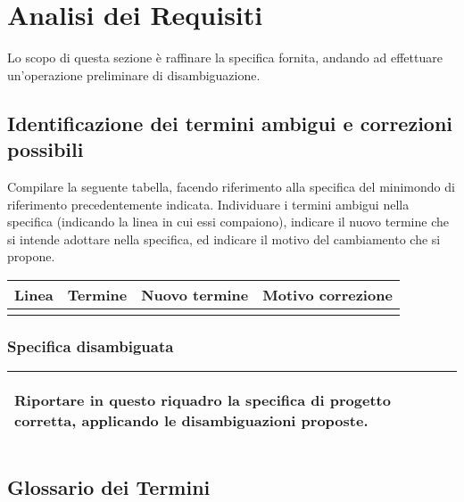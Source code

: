 \section{Analisi dei Requisiti}

\begin{templateblock}
    Lo scopo di questa sezione è raffinare la specifica fornita, andando ad
    effettuare un’operazione preliminare di disambiguazione.
\end{templateblock}

\subsection*{Identificazione dei termini ambigui e correzioni possibili}

\begin{templateblock}
    Compilare la seguente tabella, facendo riferimento alla specifica del
    minimondo di riferimento precedentemente indicata.
    Individuare i termini ambigui nella specifica
    (indicando la linea in cui essi compaiono), indicare il nuovo termine che
    si intende adottare nella specifica, ed indicare il motivo del cambiamento
    che si propone.
\end{templateblock}

\begin{tabularx}{\linewidth}{|c|c|c|Y|}
    \hline
    \textbf{Linea} & \textbf{Termine} & \textbf{Nuovo termine} & \textbf{Motivo correzione} \\\hline
                   &                  &                        &                            \\ \hline
\end{tabularx}

\subsubsection*{Specifica disambiguata}

\begin{tabularx}{\linewidth}{|X|}
    \hline
    \begin{templateblock}
        Riportare in questo riquadro la specifica di progetto corretta,
        applicando le disambiguazioni proposte.
    \end{templateblock}
    \\\hline
\end{tabularx}

\subsection*{Glossario dei Termini}


